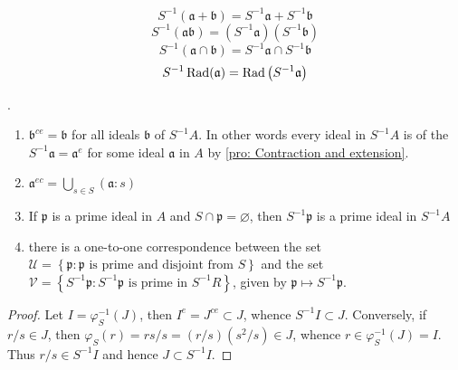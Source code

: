 \begin{corollary}
    \begin{equation*}
        S^{-1}\left(\mathfrak{a}+\mathfrak{b}\right)=S^{-1}\mathfrak{a}+S^{-1}\mathfrak{b}
    \end{equation*}
    \begin{equation*}
        S^{-1}\left(\mathfrak{a}\mathfrak{b}\right)=\left(S^{-1}\mathfrak{a}\right)\left(S^{-1}\mathfrak{b}\right)
    \end{equation*}
    \begin{equation*}
        S^{-1}\left(\mathfrak{a}\cap \mathfrak{b}\right)=S^{-1}\mathfrak{a}\cap S^{-1}\mathfrak{b}
    \end{equation*}
    \begin{equation*}
        S^{-1}\operatorname{\operatorname{Rad}}(\mathfrak{a})=\operatorname{\operatorname{Rad}}\left(S^{-1}\mathfrak{a}\right)
    \end{equation*}
\end{corollary}

\begin{theorem}.
    \begin{enumerate}
        \item
              $\mathfrak{b}^{ce}= \mathfrak{b}$ for all ideals $\mathfrak{b}$ of $S^{-1}A$.
              In other words every ideal in $S^{-1} A$ is of the $S^{-1} \mathfrak{a}=\mathfrak{a}^e$ for some ideal $\mathfrak{a}$ in $A$ by \cref{pro: Contraction and extension}.
        \item $\mathfrak{a}^{ec}=\bigcup_{s\in S} \left(\mathfrak{a}:s\right)$

        \item
              If $\mathfrak{p}$ is a prime ideal in $A$ and  $S \cap \mathfrak{p}=\varnothing$, then $S^{-1} \mathfrak{p}$ is a prime ideal in $S^{-1} A$
        \item
              there is a one-to-one correspondence between the set  $\mathcal{U}=\left\{\mathfrak{p}: \mathfrak{p} \text{ is prime and disjoint from } S\right\}$ and the set $\mathcal{V}=\left\{S^{-1}\mathfrak{p}: S^{-1}\mathfrak{p} \text{ is prime in } S^{-1} R\right\}$, given by $\mathfrak{p} \mapsto S^{-1} \mathfrak{p}$.
    \end{enumerate}
    \begin{proof}
        Let $I=\varphi_S^{-1}(J)$, then $I^e=J^{ce}\subset J$, whence $S^{-1} I \subset J$.
        Conversely, if $r / s \in J$, then $\varphi_S(r)=r s / s =(r / s)\left(s^2 / s\right) \in J$, whence $r \in \varphi_S^{-1}(J)=I$.
        Thus $r / s \in S^{-1} I$ and hence $J \subset S^{-1} I$.
    \end{proof}
\end{theorem}










